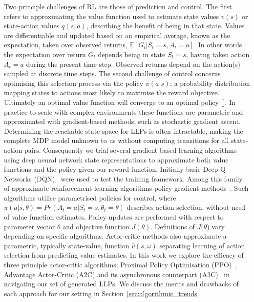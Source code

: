 \documentclass[conference,compsoc]{IEEEtran}
\begin{document}
Two principle challenges of RL are those of prediction and control. The first refers to approximating the value function used to estimate state values $v(s)$ or state-action values $q(s,a)$, describing the benefit of being in that state. Values are differentiable and updated based on an empirical average, known as the expectation, taken over observed returns, $\mathbb{E}[G_t | S_t = s, A_t = a]$. In other words the expectation over return $G_t$ depends being in state $S_t = s$, having taken action $A_t = a$ during the present time step. Observed returns depend on the action(s) sampled at discrete time steps. The second challenge of control concerns optimising this selection process via the policy $\pi(a|s)$; a probability distribution mapping states to actions most likely to maximise the reward objective. Ultimately an optimal value function will converge to an optimal policy []. In practice to scale with complex environments these functions are parametric and approximated with gradient-based methods, such as stochastic gradient ascent.
Determining the reachable state space for LLPs is often intractable, making the complete MDP model unknown to us without computing transitions for all state-action pairs. Consequently we trial several gradient-based learning algorithms using deep neural network state representations to approximate both value functions and the policy given our reward function. Initially basic Deep Q-Networks (DQN)~\cite{mnih2013playing} were used to test the training framework. Among this family of approximate reinforcement learning algorithms policy gradient methods~\cite{kakade2001natural}. Such algorithms utilise parametrised policies for control, where $\pi(a|s,\theta) = Pr(A_t=a|S_t=s,\theta_t=\theta)$ describes action selection, without need of value function estimates. Policy updates are performed with respect to parameter vector $\theta$ and objective function $J(\theta)$. Definitions of $J(\theta$) vary depending on specific algorithms. Actor-critic methods also approximate a parametric, typically state-value, function $\hat{v}(s,\omega)$ separating learning of action selection from predicting value estimates. In this work we explore the efficacy of three principle actor-critic algorithms; Proximal Policy Optimisation (PPO)~\cite{schulman2017proximal}, Advantage Actor-Critic (A2C) and its asynchronous counterpart (A3C)~\cite{mnih2016asynchronous} in navigating our set of generated LLPs. We discuss the merits and drawbacks of each approach for our setting in Section~\ref{sec:algorithmic_trends}.
\end{document}
